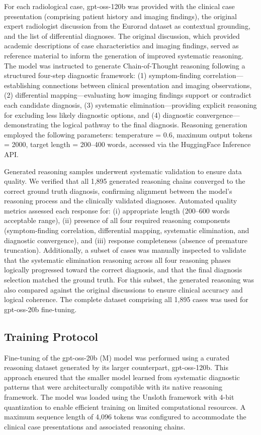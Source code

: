 \documentclass[10pt,journal,compsoc, onecolumn]{IEEEtran}
\begin{document}
For each radiological case, gpt-oss-120b was provided with the clinical case presentation (comprising patient history and imaging findings), the original expert radiologist discussion from the Eurorad dataset as contextual grounding, and the list of differential diagnoses. The original discussion, which provided academic descriptions of case characteristics and imaging findings, served as reference material to inform the generation of improved systematic reasoning. The model was instructed to generate Chain-of-Thought reasoning following a structured four-step diagnostic framework: (1) symptom-finding correlation---establishing connections between clinical presentation and imaging observations, (2) differential mapping---evaluating how imaging findings support or contradict each candidate diagnosis, (3) systematic elimination---providing explicit reasoning for excluding less likely diagnostic options, and (4) diagnostic convergence---demonstrating the logical pathway to the final diagnosis. Reasoning generation employed the following parameters: temperature = 0.6, maximum output tokens = 2000, target length = 200--400 words, accessed via the HuggingFace Inference API.

Generated reasoning samples underwent systematic validation to ensure data quality. We verified that all 1,895 generated reasoning chains converged to the correct ground truth diagnosis, confirming alignment between the model's reasoning process and the clinically validated diagnoses. Automated quality metrics assessed each response for: (i) appropriate length (200--600 words acceptable range), (ii) presence of all four required reasoning components (symptom-finding correlation, differential mapping, systematic elimination, and diagnostic convergence), and (iii) response completeness (absence of premature truncation). Additionally, a subset of cases was manually inspected to validate that the systematic elimination reasoning across all four reasoning phases logically progressed toward the correct diagnosis, and that the final diagnosis selection matched the ground truth. For this subset, the generated reasoning was also compared against the original discussions to ensure clinical accuracy and logical coherence. The complete dataset comprising all 1,895 cases was used for gpt-oss-20b fine-tuning.

\subsection*{Training Protocol}
Fine-tuning of the gpt-oss-20b (M) model was performed using a curated reasoning dataset generated by its larger counterpart, gpt-oss-120b. This approach ensured that the smaller model learned from systematic diagnostic patterns that were architecturally compatible with its native reasoning framework. The model was loaded using the Unsloth framework with 4-bit quantization to enable efficient training on limited computational resources. A maximum sequence length of 4,096 tokens was configured to accommodate the clinical case presentations and associated reasoning chains.
\end{document}

